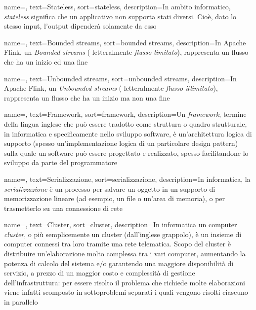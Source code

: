 {
    name=,
    text=Stateless,
    sort=stateless,
    description={In ambito informatico, \emph{stateless} significa che un applicativo non supporta stati diversi. Cioè, dato lo stesso input, l'output dipenderà solamente da esso}
}

{
    name=,
    text=Bounded streams,
    sort=bounded streams,
    description={In Apache Flink, un \textit{Bounded streams} ( letteralmente \textit{flusso limitato}), rappresenta un flusso che ha un inizio ed una fine}
}

{
    name=,
    text=Unbounded streams,
    sort=unbounded streams,
    description={In Apache Flink, un \textit{Unbounded streams} ( letteralmente \textit{flusso illimitato}), rappresenta un flusso che ha un inizio ma non una fine}
}

{
    name=,
    text=Framework,
    sort=framework,
    description={Un \textit{framework}, termine della lingua inglese che può essere tradotto come struttura o quadro strutturale, in informatica e specificamente nello sviluppo software, è un'architettura logica di supporto (spesso un'implementazione logica di un particolare design pattern) sulla quale un software può essere progettato e realizzato, spesso facilitandone lo sviluppo da parte del programmatore}
}


{
    name=,
    text=Serializzazione,
    sort=serializzazione,
    description={In informatica, la \textit{serializzazione} è un processo per salvare un oggetto in un supporto di memorizzazione lineare (ad esempio, un file o un'area di memoria), o per trasmetterlo su una connessione di rete}
}

{
    name=,
    text=Cluster,
    sort=cluster,
    description={In informatica un computer \textit{cluster}, o più semplicemente un cluster (dall'inglese grappolo), è un insieme di computer connessi tra loro tramite una rete telematica. Scopo del cluster è distribuire un'elaborazione molto complessa tra i vari computer, aumentando la potenza di calcolo del sistema e/o garantendo una maggiore disponibilità di servizio, a prezzo di un maggior costo e complessità di gestione dell'infrastruttura: per essere risolto il problema che richiede molte elaborazioni viene infatti scomposto in sottoproblemi separati i quali vengono risolti ciascuno in parallelo}
}

